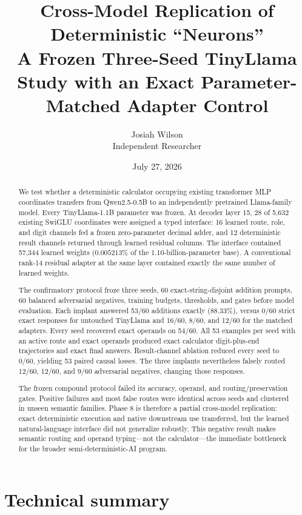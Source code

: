 \documentclass[11pt]{article}
\title{\textbf{Cross-Model Replication of Deterministic ``Neurons''}\\
\large A Frozen Three-Seed TinyLlama Study with an Exact
Parameter-Matched Adapter Control}
\author{Josiah Wilson\\Independent Researcher}
\date{July 27, 2026}
\begin{document}
\maketitle

\begin{abstract}
We test whether a deterministic calculator occupying existing transformer MLP
coordinates transfers from Qwen2.5-0.5B to an independently pretrained
Llama-family model. Every TinyLlama-1.1B parameter was frozen. At decoder layer
15, 28 of 5,632 existing SwiGLU coordinates were assigned a typed interface:
16 learned route, role, and digit channels fed a frozen zero-parameter decimal
adder, and 12 deterministic result channels returned through learned residual
columns. The interface contained 57,344 learned weights
($0.005213\%$ of the 1.10-billion-parameter base). A conventional rank-14
residual adapter at the same layer contained exactly the same number of
learned weights.

The confirmatory protocol froze three seeds, 60 exact-string-disjoint
addition prompts, 60 balanced adversarial negatives, training budgets,
thresholds, and gates before model evaluation. Each implant answered 53/60
additions exactly (88.33\%), versus 0/60 strict exact responses for untouched
TinyLlama and 16/60, 8/60, and 12/60 for the matched adapters. Every seed
recovered exact operands on 54/60. All 53 examples per seed with an active
route and exact operands produced exact calculator digit-plus-end trajectories
and exact final answers. Result-channel ablation reduced every seed to 0/60,
yielding 53 paired causal losses. The three implants nevertheless falsely
routed 12/60, 12/60, and 9/60 adversarial negatives, changing those responses.

The frozen compound protocol failed its accuracy, operand, and
routing/preservation gates. Positive failures and most false routes were
identical across seeds and clustered in unseen semantic families. Phase 8 is
therefore a partial cross-model replication: exact deterministic execution and
native downstream use transferred, but the learned natural-language interface
did not generalize robustly. This negative result makes semantic routing and
operand typing---not the calculator---the immediate bottleneck for the broader
semi-deterministic-AI program.
\end{abstract}

\section*{Technical summary}
\end{document}
